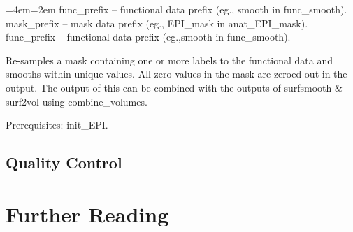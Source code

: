 \documentclass[final,titlepage,letterpaper,oneside,12pt]{article}
\renewcommand{\texttt}[2][BrickRed]{\textcolor{#1}{\ttfamily #2}}%
\newenvironment{blockquote}{%
  \par%
  \medskip
  \leftskip=4em\rightskip=2em%
  \noindent\ignorespaces}{%
  \par\medskip}
\begin{document}
\begin{blockquote}
func\_prefix -- functional data prefix (eg., smooth in func\_smooth).
mask\_prefix -- mask data prefix (eg., EPI\_mask in anat\_EPI\_mask).
func\_prefix -- functional data prefix (eg.,smooth in func\_smooth).
\end{blockquote}

\noindent Re-samples a mask containing one or more labels to the functional data and smooths within unique values. All zero values in the mask are zeroed out in the output. The output of this can be combined with the outputs of \texttt{surfsmooth} \& \texttt{surf2vol} using \texttt{combine\_volumes}.

Prerequisites: \texttt{init\_EPI}.

\subsection{Quality Control}

\section{Further Reading}

\newpage 


\end{document}
